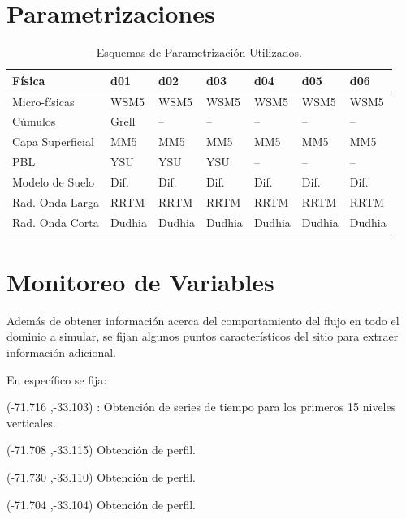 \section{Parametrizaciones}
\begin{table}[h!]
	\caption{Esquemas de Parametrización Utilizados.}\label{tab:esquemas}
	\centering
	\begin{tabular}{lllllll}
		\toprule
		Física 					& d01	&	d02	&	d03	&	d04	&	d05	&	d06 \\
		\midrule
		Micro-físicas		 	& WSM5 & WSM5 & WSM5 &WSM5&WSM5&WSM5  \\
		Cúmulos			 		& Grell & -- & -- & -- & -- & -- \\ 
		Capa Superficial	 	& MM5 & MM5 & MM5 & MM5 & MM5 & MM5 \\
		PBL				 		& YSU & YSU & YSU & -- & -- & -- \\
		Modelo de Suelo 		& Dif. & Dif. & Dif. & Dif. & Dif. & Dif. 	\\
		Rad. Onda Larga	& RRTM &RRTM&RRTM&RRTM&RRTM&RRTM \\
		Rad. Onda Corta	& Dudhia &Dudhia&Dudhia&Dudhia&Dudhia&Dudhia \\
		\bottomrule
	\end{tabular}
\end{table}
\section{Monitoreo de Variables}
Además de obtener información acerca del comportamiento del flujo en todo el dominio a simular, se fijan algunos puntos característicos del sitio para extraer información adicional.

En específico se fija:
\begin{itemize*}
	\item (-71.716 ,-33.103) : Obtención de series de tiempo para los primeros 15 niveles verticales.
	\item (-71.708 ,-33.115) Obtención de perfil.
	\item (-71.730 ,-33.110) Obtención de perfil.
	\item (-71.704 ,-33.104) Obtención de perfil.
\end{itemize*}


